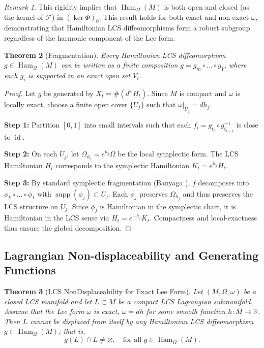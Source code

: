 \documentclass[11pt,a4paper]{amsart}
\newtheorem{theorem}{Theorem}[section]
\theoremstyle{definition}
\theoremstyle{remark}
\newtheorem{remark}[theorem]{Remark}
\newcommand{\Ham}{\operatorname{Ham}}
\newcommand{\id}{\operatorname{id}}
\begin{document}
	\begin{remark}
		This rigidity implies that $\Ham_\Omega(M)$ is both open and closed (as the kernel of $\mathcal{F}$) in $(\ker \Phi)_0$. This result holds for both exact and non-exact $\omega$, demonstrating that Hamiltonian LCS diffeomorphisms form a robust subgroup regardless of the harmonic component of the Lee form.
	\end{remark}
	
	\begin{theorem}[Fragmentation] \label{thm:fragmentation}
		Every Hamiltonian LCS diffeomorphism $g \in \Ham_\Omega(M)$ can be written as a finite composition $g = g_m \circ \dots \circ g_1$, where each $g_i$ is supported in an exact open set $V_i$.
	\end{theorem}
	
	\begin{proof}
		Let $g$ be generated by $X_t = \#(d^\omega H_t)$. Since $M$ is compact and $\omega$ is locally exact, choose a finite open cover $\{U_j\}$ such that $\omega|_{U_j} = dh_j$.
		
		\textbf{Step 1:} Partition $[0,1]$ into small intervals such that each $f_i = g_{t_i} \circ g_{t_{i-1}}^{-1}$ is close to $\id$.
		
		\textbf{Step 2:} On each $U_j$, let $\Omega_{h_j} = e^{h_j}\Omega$ be the local symplectic form. The LCS Hamiltonian $H_t$ corresponds to the symplectic Hamiltonian $K_t = e^{h_j}H_t$.
		
		\textbf{Step 3:} By standard symplectic fragmentation (Banyaga \cite{Banyaga1978}), $f$ decomposes into\\ $\phi_k \circ \dots \circ \phi_1$ with $\operatorname{supp}(\phi_j) \subset U_j$. Each $\phi_j$ preserves $\Omega_{h_j}$ and thus preserves the LCS structure on $U_j$. Since $\phi_j$ is Hamiltonian in the symplectic chart, it is Hamiltonian in the LCS sense via $H_t = e^{-h_j}K_t$. Compactness and local-exactness thus ensure the global decomposition.
	\end{proof}
	
	\subsection{Lagrangian Non-displaceability and Generating Functions}
	
	\begin{theorem}[LCS NonDisplaceability for Exact Lee Form] \label{thm:non_displaceability}
		Let $(M, \Omega, \omega)$ be a closed LCS manifold and let $L \subset M$ be a compact LCS Lagrangian submanifold. Assume that the Lee form $\omega$ is exact, $\omega = dh$ for some smooth function $h : M \to \mathbb{R}$. Then $L$ cannot be displaced from itself by any Hamiltonian LCS diffeomorphism $g \in \Ham_\Omega(M)$; that is,
		\[
		g(L) \cap L \neq \varnothing, \quad \text{for all } g \in \Ham_\Omega(M).
		\]
	\end{theorem}
	
\end{document}
